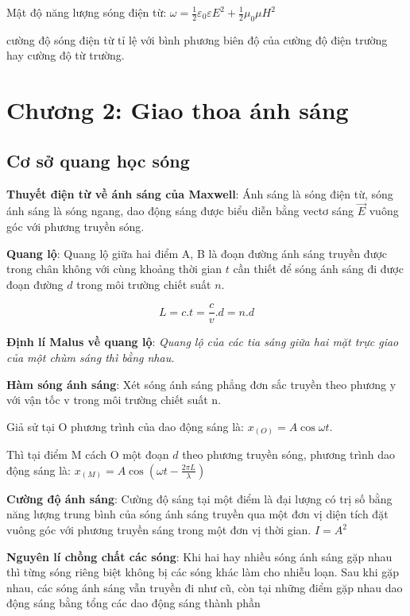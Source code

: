 \documentclass[12pt,a4paper]{article}
\begin{document}
Mật độ năng lượng sóng điện từ: $\omega = \frac{1}{2}\varepsilon_0 \varepsilon E^2 + \frac{1}{2}\mu_0 \mu H^2$

cường độ sóng điện từ tỉ lệ với bình phương biên độ của cường độ điện trường hay cường độ từ trường.

\bigskip

\section*{Chương 2: Giao thoa ánh sáng}

\subsection*{Cơ sở quang học sóng}

\textbf{Thuyết điện từ về ánh sáng của Maxwell}: Ánh sáng là sóng điện từ, sóng ánh sáng là sóng
ngang, dao động sáng được biểu diễn bằng vectơ sáng $\vec{E}$ vuông góc với phương truyền sóng.

\textbf{Quang lộ}: Quang lộ giữa hai điểm A, B là đoạn đường ánh sáng truyền được trong chân
không với cùng khoảng thời gian $t$ cần thiết để sóng ánh sáng đi được đoạn đường $d$ trong môi
trường chiết suất $n$. 

$$L = c.t = \frac{c}{v}.d = n.d$$

\textbf{Định lí Malus về quang lộ}: \textit{Quang lộ của các tia sáng giữa hai mặt trực giao của một
chùm sáng thì bằng nhau.}

\textbf{Hàm sóng ánh sáng}: Xét sóng ánh sáng phẳng đơn sắc truyền theo phương y với vận tốc v
trong môi trường chiết suất n.

Giả sử tại O phương trình của dao động sáng là: $x_{(O)} = A \cos \omega t$.

Thì tại điểm M cách O một đoạn $d$ theo phương truyền sóng, phương trình dao động sáng là: $x_{(M)} = A \cos \left( \omega t - \frac{2\pi L}{\lambda}\right)$

\textbf{Cường độ ánh sáng}: Cường độ sáng tại một điểm là đại lượng có trị số bằng năng lượng
trung bình của sóng ánh sáng truyền qua một đơn vị diện tích đặt vuông góc với phương
truyền sáng trong một đơn vị thời gian.     $I = A^2$

\textbf{Nguyên lí chồng chất các sóng}: Khi hai hay nhiều sóng ánh sáng gặp nhau thì từng sóng
riêng biệt không bị các sóng khác làm cho nhiễu loạn. Sau khi gặp nhau, các sóng ánh sáng
vẫn truyền đi như cũ, còn tại những điểm gặp nhau dao động sáng bằng tổng các dao động
sáng thành phần
\end{document}
